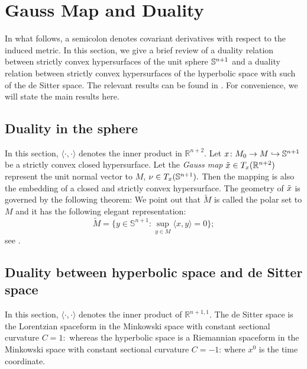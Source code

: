 \section{Gauss Map and Duality}\label{Duality}
\label{gauss_duality}
In what follows, a semicolon denotes covariant derivatives with respect to the induced metric.
In this section, we give a brief review of a duality relation between strictly convex hypersurfaces of the unit sphere $\S^{n+1}$ and a duality relation between strictly convex hypersurfaces of the hyperbolic space with such of the de Sitter space. The relevant results can be found in \cite[Ch.~9, 10]{Gerhardt:/2006}. For convenience, we will state the main results here.
\subsection{Duality in the sphere} In this section, $\langle \cdot,\cdot\rangle$ denotes the inner product in $\mathbb{R}^{n+2}.$
Let $x\cn M_0\ra M\hra \S^{n+1}$ be a strictly convex closed hypersurface. Let the {\it{Gauss map}} $\~x\in T_x(\R^{n+2})$ represent the unit normal vector to $M$, $\nu\in T_x(\S^{n+1}).$ Then the mapping
is also the embedding of a closed and strictly convex hypersurface. The geometry of $\~x$ is governed by the following theorem:
We point out that $\tilde{M}$ is called the polar set to $M$ and it has the following elegant representation:
$$\tilde{M}=\{y\in \mathbb{S}^{n+1}: \sup_{y\in M}\langle x,y\rangle=0\};$$
see \cite[Thm.~9.2.9]{Gerhardt:/2006}.
\subsection{Duality between hyperbolic space and de Sitter space} In this section, $\langle \cdot,\cdot\rangle$ denotes the inner product of $\mathbb{R}^{n+1,1}.$
The de Sitter space is the Lorentzian spaceform in the Minkowski space with constant sectional curvature $C=1:$
whereas the hyperbolic space is a Riemannian spaceform in the Minkowski space with constant sectional curvature $C=-1$:
where $x^0$ is the time coordinate.

